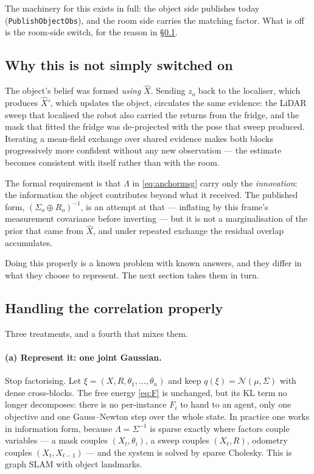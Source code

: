 \documentclass[11pt,a4paper]{report}
\theoremstyle{definition}   %
\begin{document}
The machinery for this exists in full: the object side publishes today
(\texttt{PublishObjectObs}), and the room side carries the matching factor. What is off is the
room-side switch, for the reason in \S\ref{sec:incest}.

\subsection{Why this is not simply switched on}
\label{sec:incest}

The object's belief was formed \emph{using} $\hat X$. Sending $z_o$ back to the localiser, which
produces $\hat X'$, which updates the object, circulates the same evidence: the LiDAR sweep that
localised the robot also carried the returns from the fridge, and the mask that fitted the fridge
was de-projected with the pose that sweep produced. Iterating a mean-field exchange over shared
evidence makes both blocks progressively more confident without any new observation --- the
estimate becomes consistent with itself rather than with the room.

The formal requirement is that $\Lambda$ in \eqref{eq:anchormsg} carry only the \emph{innovation}:
the information the object contributes beyond what it received. The published form,
$(\Sigma_o\oplus R_o)^{-1}$, is an attempt at that --- inflating by this frame's measurement
covariance before inverting --- but it is not a marginalisation of the prior that came from
$\hat X$, and under repeated exchange the residual overlap accumulates.

Doing this properly is a known problem with known answers, and they differ in what they choose to
represent. The next section takes them in turn.

\subsection{Handling the correlation properly}
\label{sec:correlation}

Three treatments, and a fourth that mixes them.

\paragraph{(a) Represent it: one joint Gaussian.} Stop factorising. Let
$\xi=(X,R,\theta_1,\dots,\theta_n)$ and keep $q(\xi)=\mathcal{N}(\mu,\Sigma)$ with dense
cross-blocks. The free energy \eqref{eq:F} is unchanged, but its KL term no longer decomposes:
there is no per-instance $F_i$ to hand to an agent, only one objective and one Gauss--Newton step
over the whole state. In practice one works in information form, because $\Lambda=\Sigma^{-1}$ is
sparse exactly where factors couple variables --- a mask couples $(X_t,\theta_i)$, a sweep couples
$(X_t,R)$, odometry couples $(X_t,X_{t-1})$ --- and the system is solved by sparse Cholesky. This
is graph SLAM with object landmarks.
\end{document}

